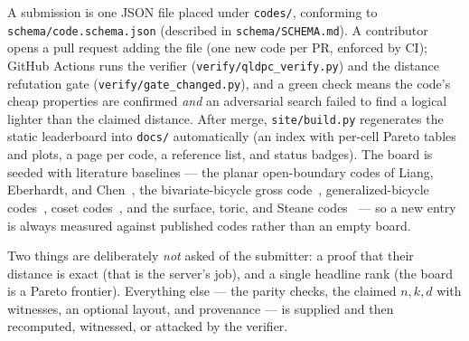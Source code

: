 \documentclass[11pt]{article}
\begin{document}
	A submission is one JSON file placed under \texttt{codes/}, conforming to
	\texttt{schema/code.schema.json} (described in \texttt{schema/SCHEMA.md}). A
	contributor opens a pull request adding the file (one new code per PR,
	enforced by CI); GitHub Actions runs the verifier
	(\texttt{verify/qldpc\_verify.py}) and the distance refutation gate
	(\texttt{verify/gate\_changed.py}), and a green check means the code's
	cheap properties are confirmed \emph{and} an adversarial search failed to
	find a logical lighter than the claimed distance. After merge,
	\texttt{site/build.py} regenerates the static leaderboard into
	\texttt{docs/} automatically (an index with per-cell Pareto tables and
	plots, a page per code, a reference list, and status badges). The board is
	seeded with literature baselines --- the planar open-boundary codes of
	Liang, Eberhardt, and Chen~\cite{liang2025planar}, the bivariate-bicycle
	gross code~\cite{bravyi2024high}, generalized-bicycle
	codes~\cite{panteleev2021degenerate,wang2022distance}, coset
	codes~\cite{aydin2026breaking}, and the surface, toric, and Steane
	codes~\cite{kitaev2003fault,steane1996error} --- so a new entry is always measured against published
	codes rather than an empty board.

	Two things are deliberately \emph{not} asked of the submitter: a proof
	that their distance is exact (that is the server's job), and a single
	headline rank (the board is a Pareto frontier). Everything else --- the
	parity checks, the claimed $n,k,d$ with witnesses, an optional layout, and
	provenance --- is supplied and then recomputed, witnessed, or attacked by
	the verifier.
\end{document}
